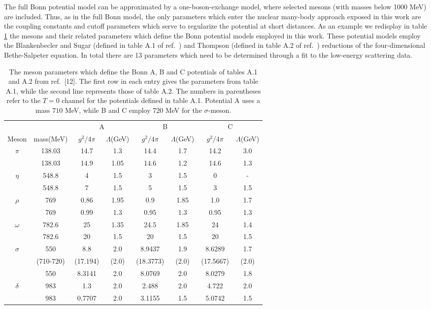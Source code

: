 The full Bonn potential model can be approximated by a one-boson-exchange
model, where selected mesons (with masses below 1000 MeV) are included. 
Thus, as in the full Bonn model, the only parameters which enter the nuclear
many-body approach exposed in this work are the coupling constants and cutoff
parameters which serve to regularize the potential at short distances. 
As an example we redisplay in table \ref{tab:chap3tab2} the mesons and their
related parameters which define the Bonn potential
models employed in this work. These potential models
employ the Blankenbecler and Sugar (defined in table A.1 of ref.\
\cite{mac89}) and
Thompson (defined in table A.2 of ref.\ \cite{mac89})
reductions of the four-dimensional Bethe-Salpeter
equation.
In total there are 13 parameters which
need to be determined through a fit to the low-energy scattering data.
\begin{table}[hbtp]
\caption{The meson parameters which define the Bonn A, B and C
potentials of tables A.1 and A.2 from ref.\ [12]. The first row
in each entry gives
the parameters from table A.1, while the second line represents
those of table A.2. The numbers in parentheses refer to the $T=0$ channel
for the potentials defined in table A.1. Potential A uses a mass $710$ MeV,
while B and C employ $720$ MeV for the $\sigma$-meson.}
\begin{center}
\begin{tabular}{cccccccc}
\\ \hline
&&
\multicolumn{2}{c}{A}&
\multicolumn{2}{c}{B}&
\multicolumn{2}{c}{C}\\
\multicolumn{1}{c}{Meson}&
\multicolumn{1}{c}{mass(MeV)}&
\multicolumn{1}{c}{$g^{2}/4\pi$}&
\multicolumn{1}{c}{$\Lambda$(GeV)}&
\multicolumn{1}{c}{$g^{2}/4\pi$}&
\multicolumn{1}{c}{$\Lambda$(GeV)}&
\multicolumn{1}{c}{$g^{2}/4\pi$}&
\multicolumn{1}{c}{$\Lambda$(GeV)}
\\\hline
$\pi$&138.03&14.7&1.3&14.4&1.7&14.2&3.0\\
&138.03&14.9&1.05&14.6&1.2&14.6&1.3\\
$\eta$&548.8&4&1.5&3&1.5&0&-\\
&548.8&7&1.5&5&1.5&3&1.5\\
$\rho$&769&0.86&1.95&0.9&1.85&1.0&1.7\\
&769&0.99&1.3&0.95&1.3&0.95&1.3\\
$\omega$&782.6&25&1.35 &24.5&1.85&24&1.4\\
&782.6&20&1.5 &20&1.5&20&1.5\\
$\sigma$&550&8.8&2.0&8.9437&1.9&8.6289&1.7\\
&(710-720)&(17.194)&(2.0)&(18.3773)&(2.0)&(17.5667)&(2.0)\\
&550&8.3141&2.0&8.0769&2.0&8.0279&1.8\\
$\delta$&983&1.3&2.0&2.488&2.0&4.722&2.0\\
&983&0.7707&2.0&3.1155&1.5&5.0742&1.5\\
\hline
\end{tabular}
\end{center} \label{tab:chap3tab2}
\end{table}
